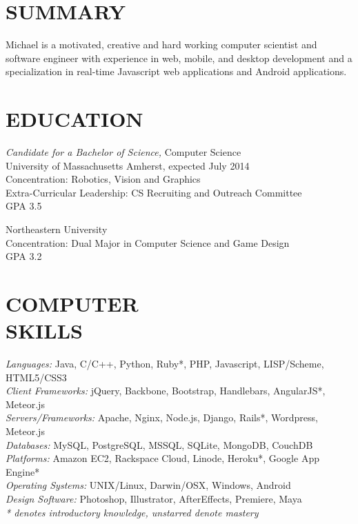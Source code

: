 \documentclass[line,margin]{res}
\begin{document}
\address{169F Brittany Mnr, Amherst, MA 01002}
\address{(781) 264-6283  --  mike@miketurley.com}

 
\begin{resume}
 
\section{SUMMARY}       Michael is a motivated, creative and hard working computer scientist and software engineer with experience in web, mobile, and desktop development and a specialization in real-time Javascript web applications and Android applications.
 
 
\section{EDUCATION} {\sl Candidate for a Bachelor of Science,} Computer Science \\
                University of Massachusetts Amherst, 
                expected July 2014 \\
                Concentration: Robotics, Vision and Graphics \\
                Extra-Curricular Leadership: CS Recruiting and Outreach Committee \\
                GPA 3.5
                
                Northeastern University \\
                Concentration: Dual Major in Computer Science and Game Design \\
                GPA 3.2
 
 
\section{COMPUTER \\ SKILLS} {\sl Languages:} Java, C/C++, Python,
                Ruby*, PHP, Javascript, LISP/Scheme, HTML5/CSS3 \\
                {\sl Client Frameworks:} jQuery, Backbone, Bootstrap, Handlebars, AngularJS*, Meteor.js \\
                {\sl Servers/Frameworks:} Apache, Nginx, Node.js, Django,
                Rails*, Wordpress, Meteor.js \\
                {\sl Databases:} MySQL, PostgreSQL, MSSQL, SQLite, MongoDB, CouchDB \\
                {\sl Platforms:} Amazon EC2, Rackspace Cloud, Linode, Heroku*, Google App Engine* \\
                {\sl Operating Systems:} UNIX/Linux, Darwin/OSX, Windows, Android \\
                {\sl Design Software:} Photoshop, Illustrator, AfterEffects, Premiere, Maya \\
                {\footnotesize {\sl \** denotes introductory knowledge, unstarred denote mastery}}
 

\end{resume}
\end{document}
